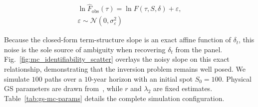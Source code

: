 \documentclass[sigconf, authorversion=true, nonacm=true]{acmart}
\begin{document}
\begin{equation}
\begin{gathered}
\ln \hat{F}_{\text{obs}}(\tau) = \ln F(\tau, S, \delta) + \varepsilon, \\
\varepsilon \sim \mathcal{N}(0,\sigma_\varepsilon^2)
\end{gathered}
\label{eq:noise-model}
\end{equation}

Because the closed-form term-structure slope is an exact affine function of $\delta_t$, this noise is the sole source of ambiguity when recovering $\delta_t$ from the panel. Fig.~\ref{fig:mc_identifiability_scatter} overlays the noisy slope on this exact relationship, demonstrating that the inversion problem remains well posed. We simulate $100$ paths over a $10$-year horizon with an initial spot $S_0 = 100$. Physical GS parameters are drawn from~\cite{Schwartz1997TheHedging}, while $r$ and $\lambda_2$ are fixed estimates. Table~\ref{tab:gs-mc-params} details the complete simulation configuration.
\end{document}
